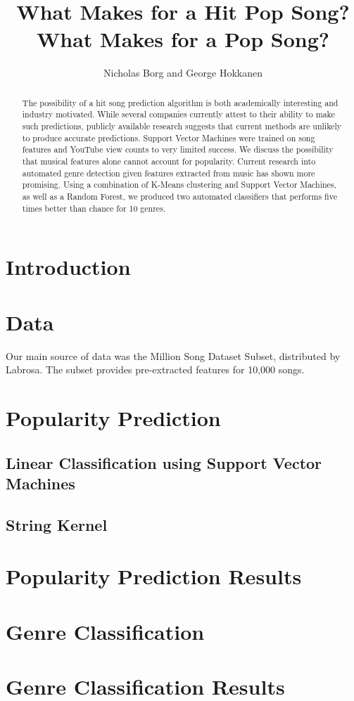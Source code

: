 \documentclass[12pt]{amsart}
\title{What Makes for a Hit Pop Song? What Makes for a Pop Song?}
\author{Nicholas Borg and George Hokkanen}
\begin{document}
\maketitle

\begin{abstract}
The possibility of a hit song prediction algorithm is both academically interesting and industry motivated. While several companies currently attest to their ability to make such predictions, publicly available research suggests that current methods are unlikely to produce accurate predictions. Support Vector Machines were trained on song features and YouTube view counts to very limited success. We discuss the possibility that musical features alone cannot account for popularity. Current research into automated genre detection given features extracted from music has shown more promising. Using a combination of K-Means clustering and Support Vector Machines, as well as a Random Forest, we produced two automated classifiers that performs five times better than chance for 10 genres. 
\end{abstract}


\begin{multicols}{2}

\section{Introduction}

\section{Data}
Our main source of data was the Million Song Dataset Subset, distributed by Labrosa. The subset provides pre-extracted features for 10,000 songs. 
\section {Popularity Prediction}
\subsection{Linear Classification using Support Vector Machines}
\subsection{String Kernel}
\section{Popularity Prediction Results}
\section{Genre Classification}
\section{Genre Classification Results}



\end{multicols}
\end{document}
